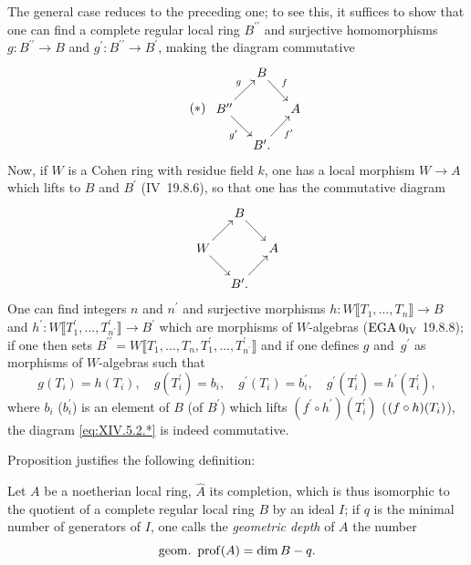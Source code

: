 The general case reduces to the preceding one; to see this, it suffices to show that one can find a complete regular local ring $B^{\prime\prime}$ and surjective homomorphisms $g\colon B^{\prime\prime}\to B$ and $g^{\prime}\colon B^{\prime\prime}\to B^{\prime}$, making the diagram commutative
\begin{equation*} \label{eq:XIV.5.2.*} \tag{$*$}
\begin{array}{c}
\xymatrix@C=10pt@R=15pt{ & B\ar[rd]^-{f} & \\
B^{\prime\prime}\ar[ru]^-{g}\ar[rd]_-{g^{\prime}} & & A\\
& B^{\prime}.\ar[ru]_-{f^{\prime}} &
}
\end{array}
\end{equation*}
Now, if $W$ is a Cohen ring with residue field $k$, one has a local morphism $W\to A$ which lifts to $B$ and $B^{\prime}$ (\EGA IV~19.8.6), so that one has the commutative diagram
$$
\xymatrix@R=15pt@C=10pt{ & B\ar[rd] & \\
W\ar[ru]\ar[rd] & & A\\
& B^{\prime}.\ar[ru] & }$$
One can find integers $n$ and $n^{\prime}$ and surjective morphisms \hbox{$h\colon W\llbracket T_{1},\dots, T_{n}\rrbracket\!\to\! B$} and $h^{\prime}\colon W\llbracket T_{1}^{\prime},\dots, T_{n^{\prime}}^{\prime}\rrbracket\to B^{\prime}$ which are morphisms of $W$-algebras ($\textup{EGA}\kern.2em 0_{\textup{IV}}$ 19.8.8); if one then sets $B^{\prime\prime}=W\llbracket T_{1},\dots, T_{n}, T_{1}^{\prime},\dots, T_{n^{\prime}}^{\prime}\rrbracket$ and if one defines $g$ and~$g^{\prime}$ as morphisms of $W$-algebras such that
$$g(T_{i})=h(T_{i}), \quad g(T_{i}^{\prime})=b_{i}, \quad g^{\prime}(T_{i})=b_{i}^{\prime}, \quad g^{\prime}(T_{i}^{\prime})=h^{\prime}(T_{i}^{\prime}),
$$
where $b_{i}$ (\resp $b_{i}^{\prime}$) is an element of $B$ (\resp of $B^{\prime}$) which lifts $(f^{\prime}\circ h^{\prime})(T_{i}^{\prime})$ (\resp $(f\circ\nobreak h)(T_{i})$), the diagram \eqref{eq:XIV.5.2.*} is indeed commutative.

Proposition  justifies the following definition:

\begin{definition} \label{XIV.5.3}
Let $A$ be a noetherian local ring, $\widehat{A}$ its completion, which is thus isomorphic to the quotient of a complete regular local ring $B$ by an ideal $I$; if $q$ is the minimal number of generators of $I$, one calls the \emph{geometric depth} of $A$ the number
$$
\operatorname{geom.\ prof}(A)=\dim B-q.
$$
\end{definition}

